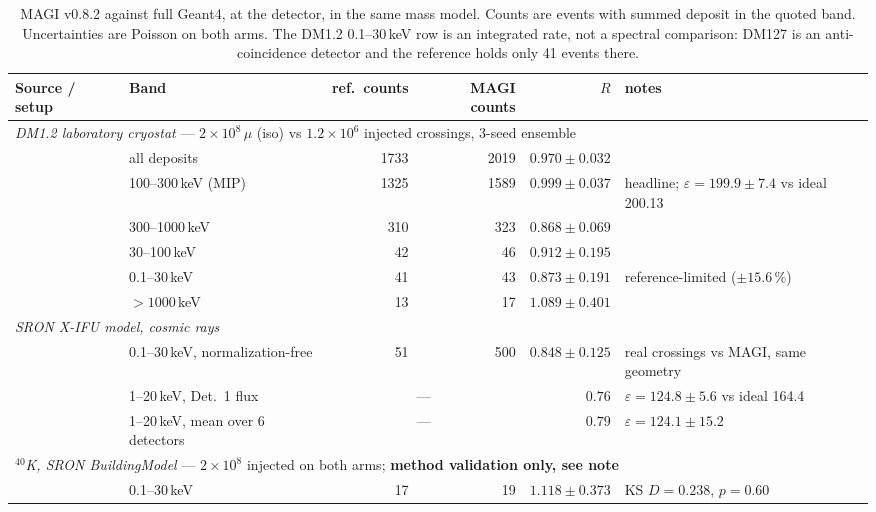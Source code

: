 \begin{table}[t]
\centering
\caption{MAGI v0.8.2 against full Geant4, at the detector, in the same mass
model. Counts are events with summed deposit in the quoted band. Uncertainties
are Poisson on both arms. The DM1.2 0.1--30\,keV row is an integrated rate, not
a spectral comparison: DM127 is an anti-coincidence detector and the reference
holds only 41 events there.}
\label{tab:validation}
\begin{tabular}{llrrrl}
\hline\hline
Source / setup & Band & ref.\ counts & MAGI counts & $R$ & notes \\
\hline
\multicolumn{6}{l}{\textit{DM1.2 laboratory cryostat} --- $2\times10^{8}\,\mu$ (iso) vs $1.2\times10^{6}$ injected crossings, 3-seed ensemble} \\
 & all deposits      & 1733 & 2019 & $0.970 \pm 0.032$ & \\
 & 100--300\,keV (MIP) & 1325 & 1589 & $\mathbf{0.999 \pm 0.037}$ & headline; $\varepsilon = 199.9 \pm 7.4$ vs ideal 200.13 \\
 & 300--1000\,keV    &  310 &  323 & $0.868 \pm 0.069$ & \\
 & 30--100\,keV      &   42 &   46 & $0.912 \pm 0.195$ & \\
 & 0.1--30\,keV      &   41 &   43 & $0.873 \pm 0.191$ & reference-limited ($\pm15.6\,\%$) \\
 & $>1000$\,keV      &   13 &   17 & $1.089 \pm 0.401$ & \\
\hline
\multicolumn{6}{l}{\textit{SRON X-IFU model, cosmic rays}} \\
 & 0.1--30\,keV, normalization-free &   51 &  500 & $0.848 \pm 0.125$ & real crossings vs MAGI, same geometry \\
 & 1--20\,keV, Det.~1 flux          & \multicolumn{2}{c}{---} & $0.76$ & $\varepsilon = 124.8 \pm 5.6$ vs ideal 164.4 \\
 & 1--20\,keV, mean over 6 detectors& \multicolumn{2}{c}{---} & $0.79$ & $\varepsilon = 124.1 \pm 15.2$ \\
\hline
\multicolumn{6}{l}{\textit{$^{40}$K, SRON BuildingModel} --- $2\times10^{8}$ injected on both arms;
\textbf{method validation only, see note}} \\
 & 0.1--30\,keV      &   17 &   19 & $1.118 \pm 0.373$ & KS $D=0.238$, $p=0.60$ \\
\hline\hline
\end{tabular}


\end{table}
